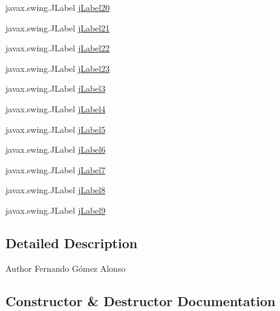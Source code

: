 \begin{DoxyCompactItemize}
\item 
javax.\+swing.\+J\+Label \mbox{\hyperlink{class_interfaz_package_1_1_interfaz_consulta_factura_a66d5645db5c2843eaf50cd96457bb4b4}{j\+Label20}}
\item 
javax.\+swing.\+J\+Label \mbox{\hyperlink{class_interfaz_package_1_1_interfaz_consulta_factura_af22e036163f2449a57e02b294812cfc7}{j\+Label21}}
\item 
javax.\+swing.\+J\+Label \mbox{\hyperlink{class_interfaz_package_1_1_interfaz_consulta_factura_a338924ad3911c841159af6eb75aa2473}{j\+Label22}}
\item 
javax.\+swing.\+J\+Label \mbox{\hyperlink{class_interfaz_package_1_1_interfaz_consulta_factura_a1f75868545728f2ec9d78490ebcb8d39}{j\+Label23}}
\item 
javax.\+swing.\+J\+Label \mbox{\hyperlink{class_interfaz_package_1_1_interfaz_consulta_factura_a05ebb163b51721c3ff33b7ac276766e7}{j\+Label3}}
\item 
javax.\+swing.\+J\+Label \mbox{\hyperlink{class_interfaz_package_1_1_interfaz_consulta_factura_a7d36559d1213a95e83abba6d9c92199b}{j\+Label4}}
\item 
javax.\+swing.\+J\+Label \mbox{\hyperlink{class_interfaz_package_1_1_interfaz_consulta_factura_a375c733d68f59477fc27bdeb6ea2dae9}{j\+Label5}}
\item 
javax.\+swing.\+J\+Label \mbox{\hyperlink{class_interfaz_package_1_1_interfaz_consulta_factura_a0769a03c29fa86b156dbb861f170e3cf}{j\+Label6}}
\item 
javax.\+swing.\+J\+Label \mbox{\hyperlink{class_interfaz_package_1_1_interfaz_consulta_factura_a590afc655fceef038e603a5471cf720e}{j\+Label7}}
\item 
javax.\+swing.\+J\+Label \mbox{\hyperlink{class_interfaz_package_1_1_interfaz_consulta_factura_af48914b9b888e1bf5f30c0ffc0886c8f}{j\+Label8}}
\item 
javax.\+swing.\+J\+Label \mbox{\hyperlink{class_interfaz_package_1_1_interfaz_consulta_factura_a1d3ecb3e98c0cd65e46d2c18f1aa1aef}{j\+Label9}}
\end{DoxyCompactItemize}


\subsection{Detailed Description}
\begin{DoxyAuthor}{Author}
Fernando Gómez Alonso 
\end{DoxyAuthor}


\subsection{Constructor \& Destructor Documentation}
\mbox{\label{class_interfaz_package_1_1_interfaz_consulta_factura_ad3cdbc84d55cc6a8f2c75f7f0541b4e3}} 
